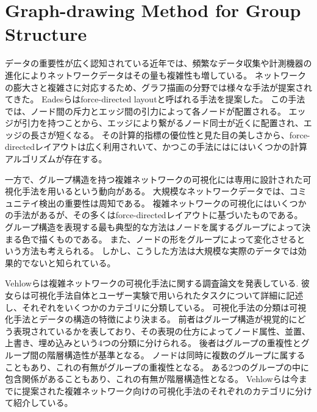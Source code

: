 \documentclass{kuee}
\begin{document}
\section{Graph-drawing Method for Group Structure}
\label{sec:graph_for_group_structure}
データの重要性が広く認知されている近年では、頻繁なデータ収集や計測機器の進化によりネットワークデータはその量も複雑性も増している。
ネットワークの膨大さと複雑さに対応するため、グラフ描画の分野では様々な手法が提案されてきた。
Eadesらはforce-directed layoutと呼ばれる手法を提案した\cite{eades84}。
この手法では、ノード間の斥力とエッジ間の引力によって各ノードが配置される。
エッジが引力を持つことから、エッジにより繋がるノード同士が近くに配置され、エッジの長さが短くなる。
その計算的指標の優位性と見た目の美しさから、force-directedレイアウトは広く利用されいて\cite{Kobourov2013ForceDirectedDA}、かつこの手法にはにはいくつかの計算アルゴリズムが存在する\cite{harel2000fast,koren2003drawing,hachul2004drawing}。

一方で、グループ構造を持つ複雑ネットワークの可視化には専用に設計された可視化手法を用いるという動向がある。
大規模なネットワークデータでは、コミュニテイ検出の重要性は周知である。
複雑ネットワークの可視化にはいくつかの手法があるが、その多くはforce-directedレイアウトに基づいたものである。
グループ構造を表現する最も典型的な方法はノードを属するグループによって決まる色で描くものである\cite{mcpherson2005discovering}。
また、ノードの形をグループによって変化させるという方法も考えられる。
しかし、こうした方法は大規模な実際のデータでは効果的でないと知られている。

Vehlowらは複雑ネットワークの可視化手法に関する調査論文を発表している\cite{Vehlow2017VisualizingGS}.
彼女らは可視化手法自体とユーザー実験で用いられたタスクについて詳細に記述し、それぞれをいくつかのカテゴリに分類している。
可視化手法の分類は可視化手法とデータの構造の特徴により決まる。
前者はグループ構造が視覚的にどう表現されているかを表しており、その表現の仕方によってノード属性、並置、上書き、埋め込みという4つの分類に分けられる。
後者はグループの重複性とグループ間の階層構造性が基準となる。
ノードは同時に複数のグループに属することもあり、これの有無がグループの重複性となる。
ある2つのグループの中に包含関係があることもあり、これの有無が階層構造性となる。
Vehlowらは今までに提案された複雑ネットワーク向けの可視化手法のそれぞれのカテゴリに分けて紹介している。
\end{document}
